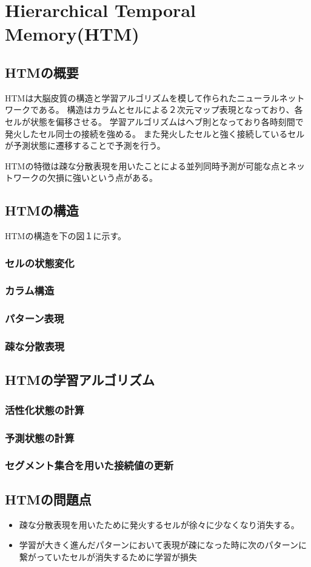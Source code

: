 \chapter{Hierarchical Temporal Memory(HTM)}
\section{HTMの概要}
HTMは大脳皮質の構造と学習アルゴリズムを模して作られたニューラルネットワークである。
構造はカラムとセルによる２次元マップ表現となっており、各セルが状態を偏移させる。
学習アルゴリズムはヘブ則となっており各時刻間で発火したセル同士の接続を強める。
また発火したセルと強く接続しているセルが予測状態に遷移することで予測を行う。

HTMの特徴は疎な分散表現を用いたことによる並列同時予測が可能な点とネットワークの欠損に強いという点がある。

\section{HTMの構造}
HTMの構造を下の図１に示す。
\subsection{セルの状態変化}
\subsection{カラム構造}
\subsection{パターン表現}
\subsection{疎な分散表現}


\section{HTMの学習アルゴリズム}
\subsection{活性化状態の計算}
\subsection{予測状態の計算}
\subsection{セグメント集合を用いた接続値の更新}


\section{HTMの問題点}
\begin{itemize}
  \item 疎な分散表現を用いたために発火するセルが徐々に少なくなり消失する。
  \item 学習が大きく進んだパターンにおいて表現が疎になった時に次のパターンに繋がっていたセルが消失するために学習が損失
\end{itemize}
